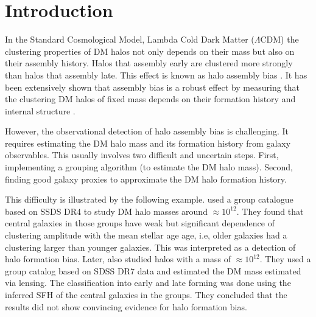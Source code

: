 \documentclass{aa}
\begin{document}
\section{Introduction}
In the Standard Cosmological Model, Lambda Cold Dark Matter
($\Lambda$CDM) the clustering properties of DM halos not only depends on their mass
but also on their assembly history.
Halos that assembly early are clustered more strongly
than halos that assembly late.
This effect is known as halo assembly bias \citep{2005MNRAS.363L..66G}.
It has been extensively shown  that
assembly bias is a robust effect
by measuring that the clustering DM halos of fixed mass depends on their formation history and internal structure \citep{2006ApJ...652...71W,2008ApJ...687...12D}.



However, the observational detection of halo assembly bias is challenging.
It requires estimating the DM halo mass and its formation history
from galaxy observables.
This usually involves two difficult and uncertain steps.
First, implementing a grouping algorithm (to estimate the DM halo
mass). 
Second, finding good galaxy proxies to approximate the DM halo
formation history.   

This difficulty is illustrated by the following example.
\citet{Lacerna_2014} used a group catalogue based on SSDS DR4
to study DM halo masses around $\approx 10^{12}$\Msunh. 
They found that central galaxies in those groups have weak but
significant dependence of clustering amplitude with the mean stellar
age age, i.e, older galaxies had a clustering larger than younger
galaxies. This was interpreted as a detection of halo formation bias.
Later, \citet{2016ApJ...819..119L} also  studied  halos with a
mass of $\approx 10^{12}$\Msunh. 
They used a group catalog based on SDSS DR7 data  and estimated the DM
mass estimated via lensing.
The classification into early and late forming was done using  the
inferred SFH of the central galaxies in the groups.  
They concluded that the results did not show convincing evidence for halo
formation bias.  
\end{document}
